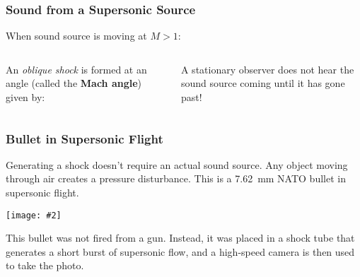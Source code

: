 \documentclass[12pt,aspectratio=169]{beamer}
\newcommand{\pic}[2]{\texttt{[image: \#2]}}
\newcommand{\eq}[2]{\vspace{#1}{\Large\begin{displaymath}#2\end{displaymath}}}
\begin{document}
\begin{frame}
  \frametitle{Sound from a Supersonic Source}
  When sound source is moving at $M>1$:
  \begin{columns}
      
    An \emph{oblique shock} is formed at an angle (called the
    \textbf{Mach angle}) given by:
      
    \eq{-.2in}{
      \gamma=\sin^{-1}\left(\frac{1}{M}\right)
    }

    A stationary observer does not hear the sound source coming until it has
    gone past!
  \end{columns}
\end{frame}


\begin{frame}
  \frametitle{Bullet in Supersonic Flight}
  Generating a shock doesn't require an actual sound source. Any object moving
  through air creates a pressure disturbance. This is a
  \SI{7.62}{\milli\metre} NATO bullet in supersonic flight.
  \begin{center}
    \pic{.35}{bullet2.jpg}
  \end{center}
  This bullet was not fired from a gun. Instead, it was placed in a shock tube
  that generates a short burst of supersonic flow, and a high-speed camera is
  then used to take the photo.
\end{frame}
\end{document}
